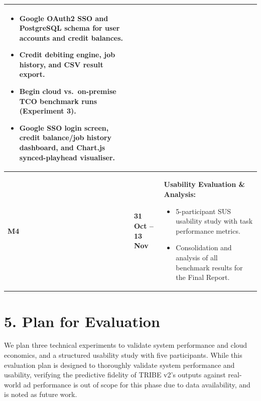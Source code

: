 \documentclass[10pt,a4paper]{article}
\begin{document}
\begin{tabularx}{\textwidth}{|l|l|X|}
\begin{itemize}[leftmargin=*, itemsep=3pt, topsep=3pt, parsep=1pt]
    \item Google OAuth2 SSO and PostgreSQL schema for user accounts and credit balances.
    \item Credit debiting engine, job history, and CSV result export.
    \item Begin cloud vs.\ on-premise TCO benchmark runs (Experiment 3).
    \item Google SSO login screen, credit balance/job history dashboard, and Chart.js synced-playhead visualiser.
\end{itemize} \\
\hline
\textbf{M4} & \textbf{31 Oct -- 13 Nov} & \textbf{Usability Evaluation \& Analysis:}
\begin{itemize}[leftmargin=*, itemsep=3pt, topsep=3pt, parsep=1pt]
    \item 5-participant SUS usability study with task performance metrics.
    \item Consolidation and analysis of all benchmark results for the Final Report.
\end{itemize} \\
\hline
\end{tabularx}

\section*{\textsf{5. Plan for Evaluation}}
We plan three technical experiments to validate system performance and cloud economics, and a structured usability study with five participants. While this evaluation plan is designed to thoroughly validate system performance and usability, verifying the predictive fidelity of TRIBE v2's outputs against real-world ad performance is out of scope for this phase due to data availability, and is noted as future work.
\end{document}

